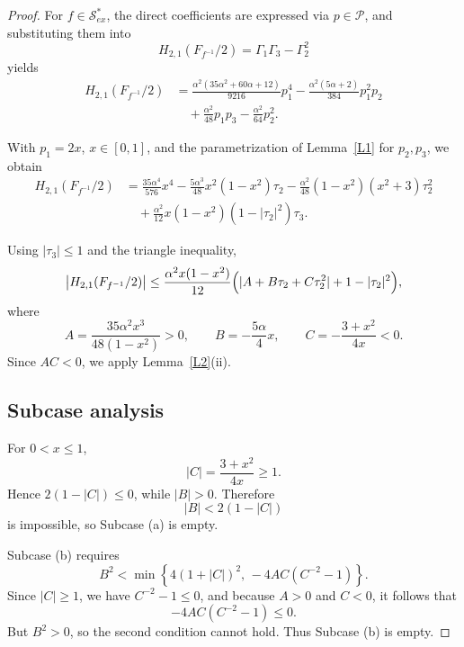 \documentclass[11pt,reqno]{amsart}
\numberwithin{equation}{section}
\begin{document}
\begin{proof}
For $f\in\mathcal{S}_{ex}^{\ast}$, the direct coefficients are expressed via $p\in\mathcal{P}$, and substituting them into
\[
H_{2,1}(F_{f^{-1}}/2)=\Gamma_1\Gamma_3-\Gamma_2^2
\]
yields
\begin{equation}\label{ND20}
\begin{aligned}
H_{2,1}\!\left(F_{f^{-1}}/2\right)
&=
\frac{\alpha^2(35\alpha^2+60\alpha+12)}{9216}p_1^4
-\frac{\alpha^2(5\alpha+2)}{384}p_1^2p_2\\
&\quad
+\frac{\alpha^2}{48}p_1p_3
-\frac{\alpha^2}{64}p_2^2.
\end{aligned}
\end{equation}

With $p_1=2x$, $x\in[0,1]$, and the parametrization of Lemma~\ref{L1} for $p_2,p_3$, we obtain
\begin{equation}\label{ND21}
\begin{aligned}
H_{2,1}\!\left(F_{f^{-1}}/2\right)
&=
\frac{35\alpha^4}{576}x^4
-\frac{5\alpha^3}{48}x^2(1-x^2)\tau_2
-\frac{\alpha^2}{48}(1-x^2)(x^2+3)\tau_2^2\\
&\quad
+\frac{\alpha^2}{12}x(1-x^2)(1-|\tau_2|^2)\tau_3.
\end{aligned}
\end{equation}

Using $|\tau_3|\le 1$ and the triangle inequality,
\begin{equation}\label{ND22}
\bigl|H_{2,1}(F_{f^{-1}}/2)\bigr|
\le
\frac{\alpha^2 x(1-x^2)}{12}
\Bigl(
|A+B\tau_2+C\tau_2^2|+1-|\tau_2|^2
\Bigr),
\end{equation}
where
\[
A=\frac{35\alpha^2 x^3}{48(1-x^2)}>0,
\qquad
B=-\frac{5\alpha}{4}x,
\qquad
C=-\frac{3+x^2}{4x}<0.
\]
Since $AC<0$, we apply Lemma~\ref{L2}(ii).

\subsection*{Subcase analysis}

For $0<x\le 1$,
\[
|C|=\frac{3+x^2}{4x}\ge 1.
\]
Hence $2(1-|C|)\le 0$, while $|B|>0$. Therefore
\[
|B|<2(1-|C|)
\]
is impossible, so Subcase (a) is empty.

Subcase (b) requires
\[
B^2<\min\left\{4(1+|C|)^2,\,-4AC(C^{-2}-1)\right\}.
\]
Since $|C|\ge 1$, we have $C^{-2}-1\le 0$, and because $A>0$ and $C<0$, it follows that
\[
-4AC(C^{-2}-1)\le 0.
\]
But $B^2>0$, so the second condition cannot hold. Thus Subcase (b) is empty.


\end{proof}
\end{document}
